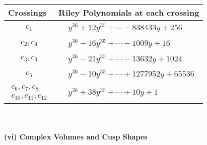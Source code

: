\documentclass[1p]{elsarticle_modified}
\theoremstyle{definition}
\begin{document}
\begin{tabular}{m{50pt}|m{274pt}}
Crossings & \hspace{64pt}Riley Polynomials at each crossing \\
\hline $$\begin{aligned}c_{1}\end{aligned}$$&$\begin{aligned}
&y^{36}+12 y^{35}+\cdots-838433 y+256
\end{aligned}$\\
\hline $$\begin{aligned}c_{2},c_{4}\end{aligned}$$&$\begin{aligned}
&y^{36}-16 y^{35}+\cdots-1009 y+16
\end{aligned}$\\
\hline $$\begin{aligned}c_{3},c_{9}\end{aligned}$$&$\begin{aligned}
&y^{36}-21 y^{35}+\cdots-13632 y+1024
\end{aligned}$\\
\hline $$\begin{aligned}c_{5}\end{aligned}$$&$\begin{aligned}
&y^{36}-10 y^{35}+\cdots+1277952 y+65536
\end{aligned}$\\
\hline $$\begin{aligned}c_{6},c_{7},c_{8}\\c_{10},c_{11},c_{12}\end{aligned}$$&$\begin{aligned}
&y^{36}+38 y^{35}+\cdots+10 y+1
\end{aligned}$\\
\hline
\end{tabular}\\~\\
\newpage\flushleft \textbf{(vi) Complex Volumes and Cusp Shapes}
\end{document}
